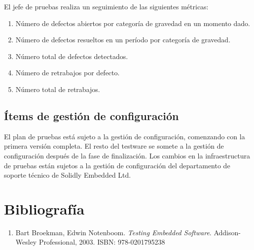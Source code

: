 \documentclass[12pt,a4paper, twoside]{article} %
\begin{document}
El jefe de pruebas realiza un seguimiento de las siguientes métricas:

\begin{enumerate}
    \item Número de defectos abiertos por categoría de gravedad en un momento dado.
    \item Número de defectos resueltos en un período por categoría de gravedad.
    \item Número total de defectos detectados.
    \item Número de retrabajos por defecto.
    \item Número total de retrabajos.
\end{enumerate}

\subsection{Ítems de gestión de configuración}

El plan de pruebas está sujeto a la gestión de configuración, comenzando con la primera versión completa. El resto del testware se somete a la gestión de configuración después de la fase de finalización. Los cambios en la infraestructura de pruebas están sujetos a la gestión de configuración del departamento de soporte técnico de Solidly Embedded Ltd.



\newpage


\section{Bibliografía}

\begin{enumerate}
      \item Bart Broekman, Edwin Notenboom. \emph{Testing Embedded Software}. Addison-Wesley Professional, 2003. ISBN: 978-0201795238
\end{enumerate}
\end{document}

